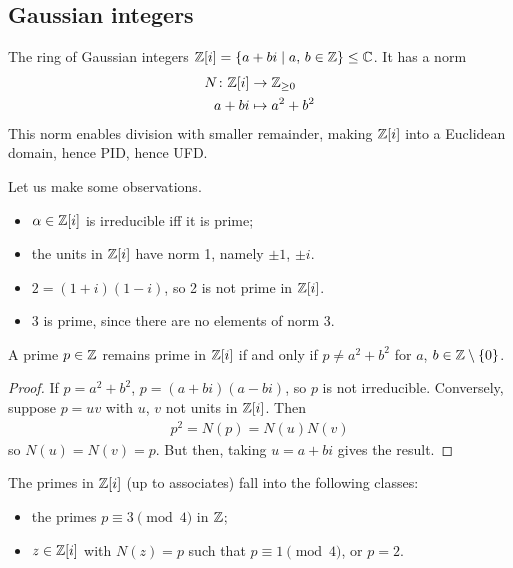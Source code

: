 \documentclass{../../template/note}
\begin{document}
    \subsection{Gaussian integers}

    The ring of Gaussian integers $\mathbb Z[i] = \{a + bi \mid a,\, b \in \mathbb Z\} \leq \mathbb C$. It has a norm
    \begin{align*}
        N\colon \mathbb Z[i] &\to \mathbb Z_{\geq 0} \\
        a + bi &\mapsto a^2+b^2
    \end{align*}
    This norm enables division with smaller remainder, making $\mathbb Z[i]$ into a Euclidean domain, hence PID, hence UFD.

    \begin{remark*}
        Let us make some observations.
        \begin{itemize}
            \item $\alpha \in \mathbb Z[i]$ is irreducible iff it is prime;
            \item the units in $\mathbb Z[i]$ have norm 1, namely $\pm 1$, $\pm i$.
            \item $2 = (1+i)(1-i)$, so 2 is not prime in $\mathbb Z[i]$.
            \item 3 is prime, since there are no elements of norm 3.
        \end{itemize}
    \end{remark*}
    
    \begin{proposition}
        A prime $p \in \mathbb Z$ remains prime in $\mathbb Z[i]$ if and only if $p \neq a^2 + b^2$ for $a$, $b \in \mathbb Z \setminus \{0\}$.
    \end{proposition}
    
    \begin{proof}
        If $p = a^2 + b^2$, $p=(a+bi)(a-bi)$, so $p$ is not irreducible. Conversely, suppose $p = uv$ with $u$, $v$ not units in $\mathbb Z[i]$. Then
        \begin{align*}
            p^2 = N(p) = N(u)N(v)
        \end{align*}
        so $N(u) = N(v) = p$. But then, taking $u=a+bi$ gives the result.        
    \end{proof}
    
    \begin{theorem}
        The primes in $\mathbb Z[i]$ (up to associates) fall into the following classes:
        \begin{itemize}
            \item the primes $p \equiv 3 \pmod 4$ in $\mathbb Z$;
            \item $z \in \mathbb Z[i]$ with $N(z) = p$ such that $p \equiv 1 \pmod 4$, or $p=2$.
        \end{itemize}
    \end{theorem}
    
\end{document}
